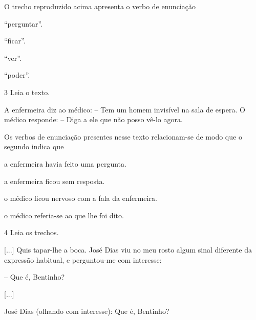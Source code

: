 O trecho reproduzido acima apresenta o verbo de enunciação

\begin{escolha}
\item “perguntar”.

\item “ficar”.

\item “ver”.

\item “poder”.
\end{escolha}

\num{3} Leia o texto.

\begin{myquote}
A enfermeira diz ao médico:
– Tem um homem invisível na sala de espera.
O médico responde:
– Diga a ele que não posso vê-lo agora.

\end{myquote}

Os verbos de enunciação presentes nesse texto relacionam-se de modo que o segundo indica que

\begin{escolha}
\item a enfermeira havia feito uma pergunta.

\item a enfermeira ficou sem resposta.

\item o médico ficou nervoso com a fala da enfermeira.

\item o médico referia-se ao que lhe foi dito.
\end{escolha}



\num{4} Leia os trechos.

\begin{myquote}
{[}...{]} Quis tapar-lhe a boca. José Dias viu no meu rosto algum
sinal diferente da expressão habitual, e perguntou-me com interesse:

– Que é, Bentinho?

{[}...{]}

\end{myquote}


\begin{myquote}
José Dias (olhando com interesse): Que é, Bentinho?

\end{myquote}

